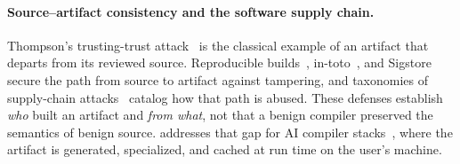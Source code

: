 \paragraph{Source--artifact consistency and the software supply chain.} Thompson's trusting-trust
attack~\cite{DBLP:journals/cacm/Thompson84} is the classical example of an artifact that departs from its reviewed source.
Reproducible builds~\cite{DBLP:journals/software/LambZ22}, in-toto~\cite{DBLP:conf/uss/Torres-AriasAKC19}, and Sigstore~\cite{DBLP:conf/ccs/NewmanMT22} secure the path from
source to artifact against tampering, and taxonomies of supply-chain attacks~\cite{DBLP:conf/dimva/OhmPS020,DBLP:conf/sp/LadisaPMB23} catalog
how that path is abused. These defenses establish \emph{who} built an artifact and \emph{from what}, not that a benign compiler
preserved the semantics of benign source. \tool addresses that gap for AI compiler stacks~\cite{DBLP:conf/nips/PaszkeGMLBCKLGA19,DBLP:conf/asplos/AnselYHGJVBBBBC24,DBLP:conf/osdi/ChenMJZYSCWHCGK18}, where the artifact is generated, specialized, and
cached at run time on the user's machine.
